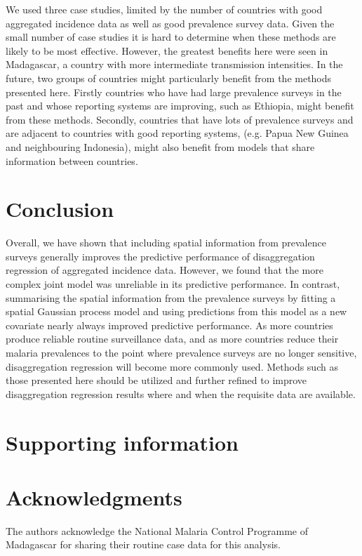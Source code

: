 \documentclass{statsoc}
\begin{document}
We used three case studies, limited by the number of countries with good aggregated incidence data as well as good prevalence survey data.
Given the small number of case studies it is hard to determine when these methods are likely to be most effective.
However, the greatest benefits here were seen in Madagascar, a country with more intermediate transmission intensities.
In the future, two groups of countries might particularly benefit from the methods presented here.
Firstly countries who have had large prevalence surveys in the past and whose reporting systems are improving, such as Ethiopia, might benefit from these methods.
Secondly, countries that have lots of prevalence surveys and are adjacent to countries with good reporting systems, (e.g. Papua New Guinea and neighbouring Indonesia), might also benefit from models that share information between countries.


\section*{Conclusion}


Overall, we have shown that including spatial information from prevalence surveys generally improves the predictive performance of disaggregation regression of aggregated incidence data.
However, we found that the more complex joint model was unreliable in its predictive performance.
In contrast, summarising the spatial information from the prevalence surveys by fitting a spatial Gaussian process model and using predictions from this model as a new covariate nearly always improved predictive performance.
As more countries produce reliable routine surveillance data, and as more countries reduce their malaria prevalences to the point where prevalence surveys are no longer sensitive, disaggregation regression will become more commonly used. 
Methods such as those presented here should be utilized and further refined to improve disaggregation regression results where and when the requisite data are available.



\section*{Supporting information}


\section*{Acknowledgments}
The authors acknowledge the National Malaria Control Programme of Madagascar for sharing their routine case data for this analysis.






 
\end{document}
